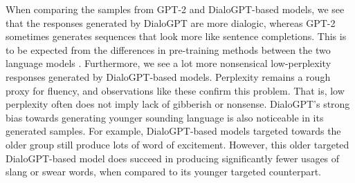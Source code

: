 When comparing the samples from GPT-2 and DialoGPT-based models, we see that the responses generated by DialoGPT are more dialogic, whereas GPT-2 sometimes generates sequences that look more like sentence completions. This is to be expected from the differences in pre-training methods between the two language models \citep{zhang2019dialogpt}. Furthermore, we see a lot more nonsensical low-perplexity responses generated by DialoGPT-based models. Perplexity remains a rough proxy for fluency, and observations like these confirm this problem. That is, low perplexity often does not imply lack of gibberish or nonsense. DialoGPT's strong bias towards generating younger sounding language is also noticeable in its generated samples. For example, DialoGPT-based models targeted towards the older group still produce lots of word of excitement. However, this older targeted DialoGPT-based model does succeed in producing significantly fewer usages of slang or swear words, when compared to its younger targeted counterpart.






